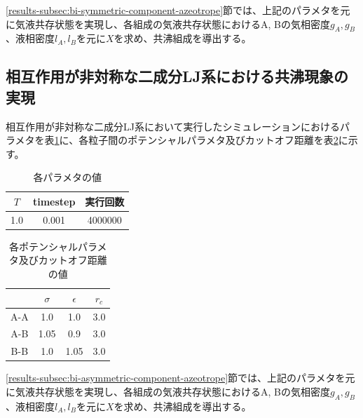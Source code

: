 \documentclass[titlepage]{jsreport}
\begin{document}
\ref{results-subsec:bi-symmetric-component-azeotrope}節では、上記のパラメタを元に気液共存状態を実現し、各組成の気液共存状態におけるA, Bの気相密度$g_A, g_B$、液相密度$l_A, l_B$を元に$X$を求め、共沸組成を導出する。


\subsection{相互作用が非対称な二成分LJ系における共沸現象の実現} \label{method-subsec:bi-asymmetric-component-azeotrope}
相互作用が非対称な二成分LJ系において実行したシミュレーションにおけるパラメタを表\ref{table:asymmetric-bi-component-azeotrope-parameter}に、各粒子間のポテンシャルパラメタ及びカットオフ距離を表\ref{table:asymmetric-bi-component-azeotrope-potential-parameter}に示す。

\begin{table}[htbp]
    \begin{center}
        \caption{各パラメタの値}
        \label{table:asymmetric-bi-component-azeotrope-parameter}
            \begin{tabular}{c c c}
                $T$ & timestep & 実行回数 \\
                \hline
                1.0 & 0.001 & 4000000 \\
            \end{tabular}
    \end{center}
\end{table}

\begin{table}[htbp]
    \begin{center}
        \caption{各ポテンシャルパラメタ及びカットオフ距離の値}
        \label{table:asymmetric-bi-component-azeotrope-potential-parameter}
            \begin{tabular}{c c c c}
                & $\sigma$ & $\epsilon$ & $r_c$ \\
                \hline
                A-A & 1.0 & 1.0 & 3.0 \\
                A-B & 1.05 & 0.9 & 3.0 \\
                B-B & 1.0 & 1.05 & 3.0
            \end{tabular}
    \end{center}
\end{table}


\ref{results-subsec:bi-asymmetric-component-azeotrope}節では、上記のパラメタを元に気液共存状態を実現し、各組成の気液共存状態におけるA, Bの気相密度$g_A, g_B$、液相密度$l_A, l_B$を元に$X$を求め、共沸組成を導出する。
\end{document}
